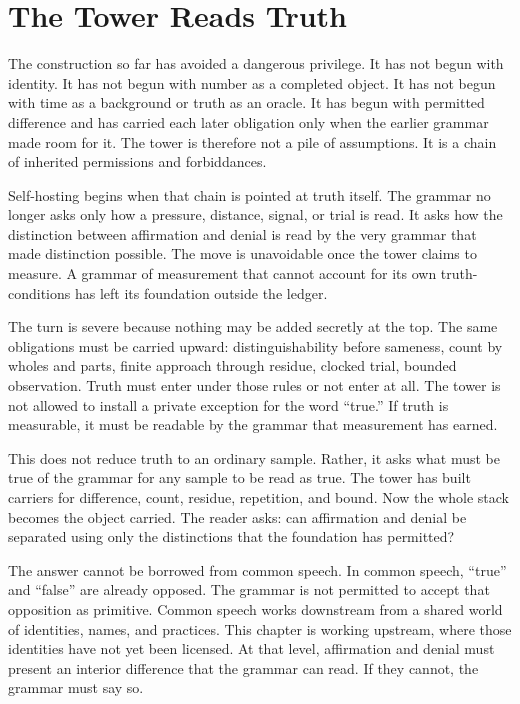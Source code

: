 \section{The Tower Reads Truth}

The construction so far has avoided a dangerous privilege. It has not
begun with identity. It has not begun with number as a completed object.
It has not begun with time as a background or truth as an oracle. It has
begun with permitted difference and has carried each later obligation
only when the earlier grammar made room for it. The tower is therefore
not a pile of assumptions. It is a chain of inherited permissions and
forbiddances.

Self-hosting begins when that chain is pointed at truth itself. The
grammar no longer asks only how a pressure, distance, signal, or trial
is read. It asks how the distinction between affirmation and denial is
read by the very grammar that made distinction possible. The move is
unavoidable once the tower claims to measure. A grammar of measurement
that cannot account for its own truth-conditions has left its foundation
outside the ledger.

The turn is severe because nothing may be added secretly at the top. The
same obligations must be carried upward: distinguishability before
sameness, count by wholes and parts, finite approach through residue,
clocked trial, bounded observation. Truth must enter under those rules
or not enter at all. The tower is not allowed to install a private
exception for the word ``true.'' If truth is measurable, it must be
readable by the grammar that measurement has earned.

This does not reduce truth to an ordinary sample. Rather, it asks what
must be true of the grammar for any sample to be read as true. The tower
has built carriers for difference, count, residue, repetition, and
bound. Now the whole stack becomes the object carried. The reader asks:
can affirmation and denial be separated using only the distinctions that
the foundation has permitted?

The answer cannot be borrowed from common speech. In common speech,
``true'' and ``false'' are already opposed. The grammar is not permitted
to accept that opposition as primitive. Common speech works downstream
from a shared world of identities, names, and practices. This chapter is
working upstream, where those identities have not yet been licensed. At
that level, affirmation and denial must present an interior difference
that the grammar can read. If they cannot, the grammar must say so.


